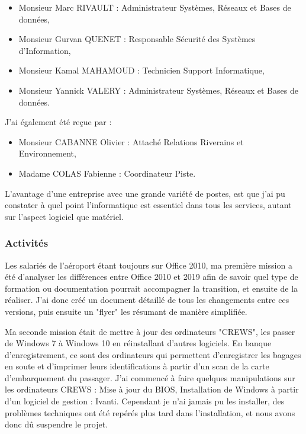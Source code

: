 \begin{itemize}
    \item Monsieur Marc RIVAULT : Administrateur Systèmes, Réseaux et Bases de données,
    \item Monsieur Gurvan QUENET : Responsable Sécurité des Systèmes d'Information,
    \item Monsieur Kamal MAHAMOUD : Technicien Support Informatique,
    \item Monsieur Yannick VALERY : Administrateur Systèmes, Réseaux et Bases de données.
\end{itemize}

J'ai également été reçue par :

\begin{itemize}
    \item Monsieur CABANNE Olivier : Attaché Relations Riverains et Environnement,
    \item Madame COLAS Fabienne : Coordinateur Piste.
\end{itemize}


L'avantage d'une entreprise avec une grande variété de postes, est que j'ai pu constater à quel point l'informatique est essentiel dans tous les services, autant sur l'aspect logiciel que matériel.

\subsubsection*{Activités}

Les salariés de l'aéroport étant toujours sur Office 2010, ma première mission a été d'analyser les différences entre Office 2010 et 2019 afin de savoir quel type de formation ou documentation pourrait accompagner la transition, et ensuite de la réaliser.
J'ai donc créé un document détaillé de tous les changements entre ces versions, puis ensuite un "flyer" les résumant de manière simplifiée.\newline

Ma seconde mission était de mettre à jour des ordinateurs "CREWS", les passer de Windows 7 à Windows 10 en réinstallant d'autres logiciels. En banque d'enregistrement, ce sont des ordinateurs qui permettent d'enregistrer les bagages en soute et d'imprimer leurs identifications à partir d'un scan de la carte d'embarquement du passager.
J'ai commencé à faire quelques manipulations sur les ordinateurs CREWS : Mise à jour du BIOS, Installation de Windows à partir d'un logiciel de gestion : Ivanti.
Cependant je n'ai jamais pu les installer, des problèmes techniques ont été repérés plus tard dans l'installation, et nous avons donc dû suspendre le projet.\newline

